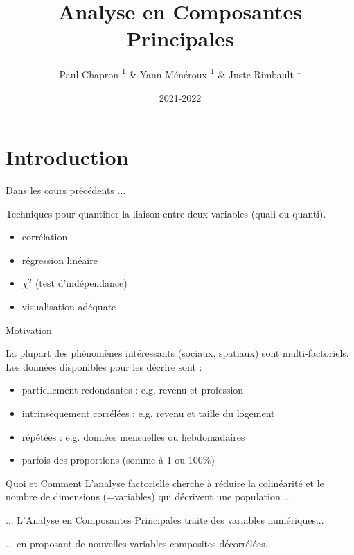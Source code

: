 \documentclass{beamer}
\title{Analyse en Composantes Principales}
\subtitle{}
\date{2021-2022}
\author{Paul Chapron \textsuperscript{1} \& Yann Ménéroux \textsuperscript{1} \& Juste Rimbault \textsuperscript{1}}
\institute{ \textsuperscript{1}IGN-ENSG-UGE}
\begin{document}
\maketitle	

\section{Introduction} 

\begin{frame}{Dans les cours précédents ... }


Techniques pour quantifier la liaison entre \alert{deux} variables (quali ou quanti). 

\begin{itemize}
\item corrélation
\item régression linéaire
\item $\chi^2$  (test d'indépendance)
\item visualisation adéquate 
\end{itemize}

\end{frame}


\begin{frame}{Motivation}


La plupart des phénomènes intéressants (sociaux, spatiaux) sont \alert{multi-factoriels}. Les données disponibles pour les décrire sont :

\begin{itemize}
	\item partiellement \alert{redondantes}  :   e.g. revenu et profession
	\item intrinsèquement \alert{corrélées} : e.g. revenu et taille du logement
  \item répétées : e.g. données mensuelles ou hebdomadaires
	\item parfois des proportions (somme à 1 ou 100\%)
\end{itemize}
\end{frame}




\begin{frame}{Quoi et Comment}
L'analyse \alert{factorielle}  cherche à réduire la \alert{colinéarité} et le \alert{nombre de dimensions} (=variables) qui décrivent une population ... 

\medskip \medskip
... L'\alert{Analyse en Composantes Principales} traite des variables \alert{numériques}...

\medskip \medskip

... en proposant de nouvelles variables \alert{composites décorrélées}.
\end{frame}
\end{document}
